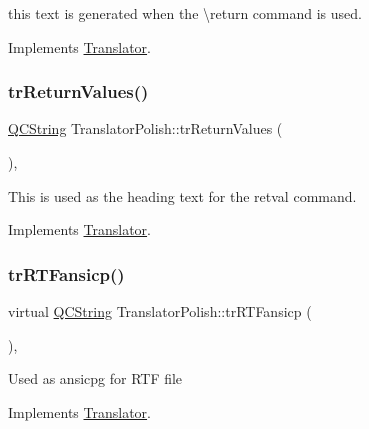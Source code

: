 this text is generated when the \textbackslash{}return command is used. 

Implements \mbox{\hyperlink{class_translator}{Translator}}.

\mbox{\label{class_translator_polish_a64ed3d915abcab0248d06de14478c910}} 
\subsubsection{\texorpdfstring{trReturnValues()}{trReturnValues()}}
{\footnotesize\ttfamily \mbox{\hyperlink{class_q_c_string}{Q\+C\+String}} Translator\+Polish\+::tr\+Return\+Values (\begin{DoxyParamCaption}{ }\end{DoxyParamCaption})\hspace{0.3cm}{\ttfamily [inline]}, {\ttfamily [virtual]}}

This is used as the heading text for the retval command. 

Implements \mbox{\hyperlink{class_translator}{Translator}}.

\mbox{\label{class_translator_polish_a03cafa9e4c4b5c191d1e52c81862235f}} 
\subsubsection{\texorpdfstring{trRTFansicp()}{trRTFansicp()}}
{\footnotesize\ttfamily virtual \mbox{\hyperlink{class_q_c_string}{Q\+C\+String}} Translator\+Polish\+::tr\+R\+T\+Fansicp (\begin{DoxyParamCaption}{ }\end{DoxyParamCaption})\hspace{0.3cm}{\ttfamily [inline]}, {\ttfamily [virtual]}}

Used as ansicpg for R\+TF file 

Implements \mbox{\hyperlink{class_translator_a9953a4c0e6a4fc7d017abcd5c2939e0f}{Translator}}.

\mbox{\label{class_translator_polish_a88a1c426ffc799dd4217c52dfb7f8170}} 

